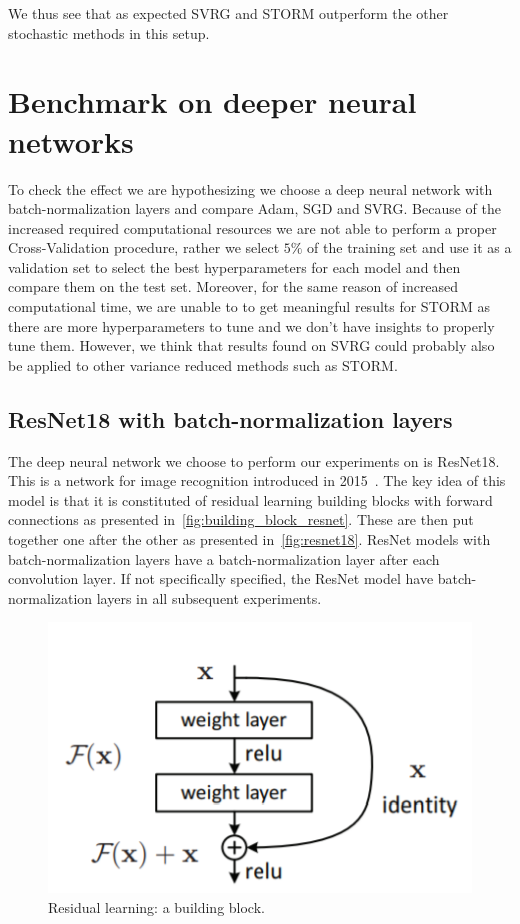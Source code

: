 \documentclass[a4paper,11pt,oneside]{report}
\begin{document}
We thus see that as expected SVRG and STORM outperform the other stochastic methods in this setup.


\section{Benchmark on deeper neural networks}
To check the effect we are hypothesizing we choose a deep neural network with batch-normalization layers and compare Adam, SGD and SVRG. Because of the increased required computational resources we are not able to perform a proper Cross-Validation procedure, rather we select $5\%$ of the training set and use it as a validation set to select the best hyperparameters for each model and then compare them on the test set. Moreover, for the same reason of increased computational time, we are unable to to get meaningful results for STORM as there are more hyperparameters to tune and we don't have insights to properly tune them. However, we think that results found on SVRG could probably also be applied to other variance reduced methods such as STORM.


\subsection{ResNet18 with batch-normalization layers}


The deep neural network we choose to perform our experiments on is ResNet18. This is a network for image recognition introduced in 2015~\cite{he2015deep}. The key idea of this model is that it is constituted of residual learning building blocks with forward connections as presented in~\autoref{fig:building_block_resnet}. These are then put together one after the other as presented in~\autoref{fig:resnet18}. ResNet models with batch-normalization layers have a batch-normalization layer after each convolution layer. If not specifically specified, the ResNet model have batch-normalization layers in all subsequent experiments.

\begin{figure}
    \centering
    \includegraphics[scale=1]{midterm presentation/images/building_block_ResNet.png}
    \caption{Residual learning: a building block.}
    \label{fig:building_block_resnet}
\end{figure}
\end{document}
